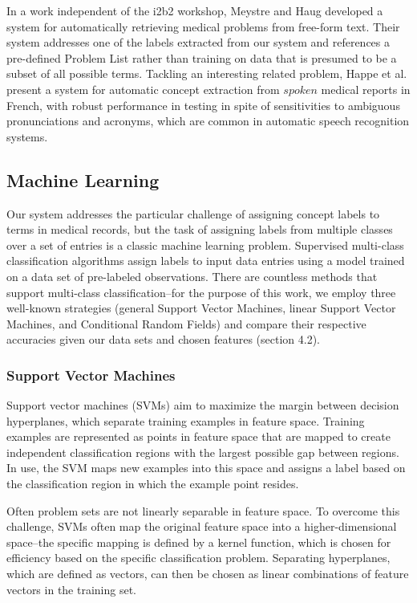\documentclass[preprint]{style}
\begin{document}
In a work independent of the i2b2 workshop, Meystre and Haug \cite{meystre} developed a system for automatically retrieving medical problems from free-form text. Their system addresses one of the labels extracted from our system and references a pre-defined Problem List rather than training on data that is presumed to be a subset of all possible terms. Tackling an interesting related problem, Happe et al. \cite{heppe} present a system for automatic concept extraction from $spoken$ medical reports in French, with robust performance in testing in spite of sensitivities to ambiguous pronunciations and acronyms, which are common in automatic speech recognition systems. 

 

\subsection{Machine Learning}

Our system addresses the particular challenge of assigning concept labels to terms in medical records, but the task of assigning labels from multiple classes over a set of entries is a classic machine learning problem. Supervised multi-class classification algorithms assign labels to input data entries using a model trained on a data set of pre-labeled observations. There are countless methods that support multi-class classification--for the purpose of this work, we employ three well-known strategies (general Support Vector Machines, linear Support Vector Machines, and Conditional Random Fields) and compare their respective accuracies given our data sets and chosen features (section 4.2).

\subsubsection{Support Vector Machines}
Support vector machines (SVMs) aim to maximize the margin between decision hyperplanes, which separate training examples in feature space. Training examples are represented as points in feature space that are mapped to create independent classification regions with the largest possible gap between regions. In use, the SVM maps new examples into this space and assigns a label based on the classification region in which the example point resides. 

Often problem sets are not linearly separable in feature space. To overcome this challenge, SVMs often map the original feature space into a higher-dimensional space--the specific mapping is defined by a kernel function, which is chosen for efficiency based on the specific classification problem. Separating hyperplanes, which are defined as vectors, can then be chosen as linear combinations of feature vectors in the training set.
\end{document}
